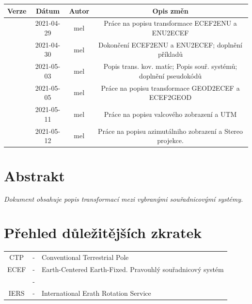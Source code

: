 \documentclass[11pt,a4paper]{article}
\title{\normalfont{libGeo: Popis souřadnicových systémů a transformace mezi vybranými systémy}}
\author{\textsc{Michal Eliaš}}
\date{}
\begin{document}
\maketitle

\setcounter{tocdepth}{2} 


\begin{table}[ht!]
\centering
\begin{tabular}{c|c|c|c}
\hline
Verze & Dátum & Autor & Opis změn \\
\hline
\hline
[0.1] & 2021-04-29 & mel & Práce na popisu transformace ECEF2ENU a ENU2ECEF\\
\hline
[0.2] & 2021-04-30 & mel & Dokončení ECEF2ENU a ENU2ECEF; doplnění příkladů \\
\hline
[0.3] & 2021-05-03 & mel & Popis trans. kov. matíc; Popis souř. systémů; doplnění pseudokódů \\
\hline
[0.4] & 2021-05-05 & mel & Práce na popisu transformace GEOD2ECEF a ECEF2GEOD \\
\hline
[0.5] & 2021-05-11 & mel & Práce na popisu valcového zobrazení a UTM \\
\hline
[0.6] & 2021-05-12 & mel & Práce na popisu azimutálniho zobrazení a Stereo projekce. \\
\hline

\end{tabular}
\end{table}

\tableofcontents %

\listoffigures %

\listoftables %

\section*{Abstrakt}
\textit{
Dokument obsahuje popis transformací mezi vybranými souřadnicovýmí systémy.
}

\newpage 


\section*{Přehled důležitějších zkratek}

\begin{table}[ht!]
  \begin{tabular}{c c l}
    CTP  & - & Conventional Terrestrial Pole  \\
    ECEF & - & Earth-Centered Earth-Fixed. Pravouhlý souřadnicový systém \\
  & - & \\   
    IERS & - & International Erath Rotation Service \\
  \end{tabular}
\end{table}
\end{document}

